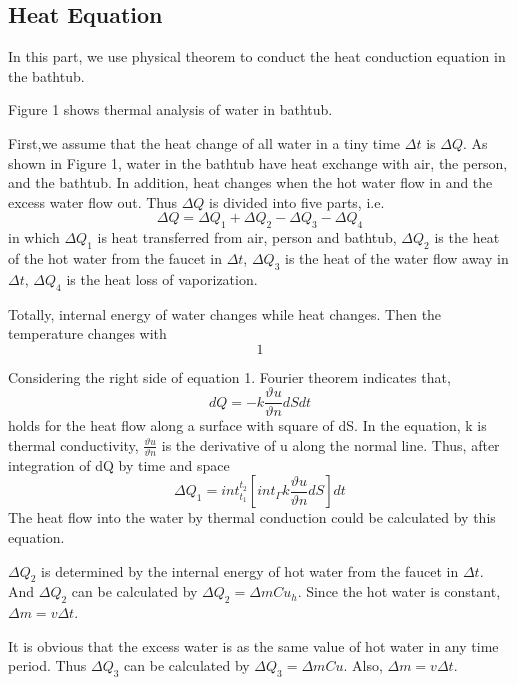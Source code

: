 \documentclass[12pt,a4paper,titlepage]{article}
\begin{document}
\subsection{Heat Equation}
\label{sec:heat equation}

In this part, we use physical theorem to conduct the heat conduction equation
in the bathtub.

Figure 1 shows thermal analysis of water in bathtub.

First,we assume that the heat change of all water in a tiny time $\Delta t$ is $\Delta Q$.
As shown in Figure 1, water in the bathtub have heat exchange with air, the person, and the bathtub.
In addition, heat changes when the hot water flow in and the excess water flow out.
Thus $\Delta Q$ is divided into five parts, i.e.
\begin{equation}
 \Delta Q=\Delta Q_1+\Delta Q_2-\Delta Q_3-\Delta Q_4
\end{equation}
in which $\Delta Q_1$ is heat transferred from air, person and bathtub,
$\Delta Q_2$ is the heat of the hot water from the faucet in $\Delta t$,
$\Delta Q_3$ is the heat of the water flow away in $\Delta t$,
$\Delta Q_4$ is the heat loss of vaporization.

Totally, internal energy of water changes while heat changes.
Then the temperature changes with
\begin{equation}
 1
\end{equation}

Considering the right side of equation 1.
Fourier theorem indicates that,
\begin{equation}
 dQ=-k\frac{\vartheta u}{\vartheta n}dSdt
\end{equation}
holds for the heat flow along a surface with square of dS.
In the equation, k is thermal conductivity, $\frac{\vartheta u}{\vartheta n}$
is the derivative of u along the normal line. Thus, after integration of dQ by time and
space
\begin{equation}
 \Delta Q_1=int_{t_1}^{t_2}[{int_{\Gamma}}k\frac{\vartheta u}{\vartheta n}dS]dt
\end{equation}
The heat flow into the water by thermal conduction could be calculated by this equation.

$\Delta Q_2$ is determined by the internal energy of hot water from the faucet in $\Delta t$.
And $\Delta Q_2$ can be calculated by
$\Delta Q_2={\Delta m}C{u_h}$.
Since the hot water is constant,
$\Delta m=v{\Delta t}$.

It is obvious that the excess water is as the same value of hot water in any time period.
Thus $\Delta Q_3$ can be calculated by
$\Delta Q_3={\Delta m}Cu$.
Also, $\Delta m=v{\Delta t}$.
\end{document}
